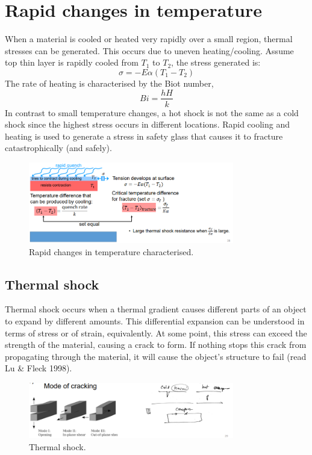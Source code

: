 \section{Rapid changes in temperature}
When a material is cooled or heated very rapidly over a small region, thermal stresses can be generated. This occurs due to uneven heating/cooling. Assume top thin layer is rapidly cooled from $T_1$ to $T_2$, the stress generated is:
\begin{equation}
    \sigma = - E \alpha \left(T_1 - T_2\right)
\end{equation}
The rate of heating is characterised by the Biot number,
\begin{equation}
    Bi = \frac{hH}{k}
\end{equation}
In contrast to small temperature changes, a hot shock is not the same as a cold shock since the highest stress occurs in different locations. Rapid cooling and heating is used to generate a stress in safety glass that causes it to fracture catastrophically (and safely).
\begin{figure}[H]
    \centering
    \includegraphics[width = 0.8\textwidth]{img/figure52.png}
    \caption{Rapid changes in temperature characterised.}
\end{figure}
\subsection{Thermal shock}
Thermal shock occurs when a thermal gradient causes different parts of an object to expand by different amounts. This differential expansion can be understood in terms of stress or of strain, equivalently. At some point, this stress can exceed the strength of the material, causing a crack to form. If nothing stops this crack from propagating through the material, it will cause the object's structure to fail (read Lu \& Fleck 1998).
\begin{figure}[H]
    \centering
    \includegraphics[width = 0.8\textwidth]{img/figure53.png}
    \caption{Thermal shock.}
\end{figure}
